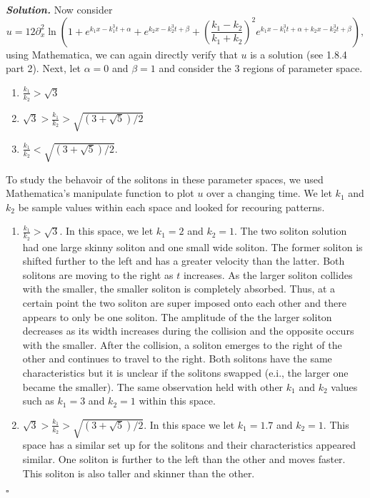 \documentclass[12pt]{report}
\newenvironment{solution}[1][\it{Solution}]{\textbf{#1. } }{$\square$}
\begin{document}
\begin{solution}
    \noindent
    Now consider
    $$u = 12 \partial_x^2\ln\left(1 + e^{k_1 x - k_1^3t + \alpha} + e^{k_2 x - k_2^3t + \beta} + \left(\frac{k_1-k_2}{k_1 + k_2}\right)^2e^{k_1x - k_1^3t + \alpha + k_2x - k_2^3t+ \beta}\right),$$
    using Mathematica, we can again directly verify that $u$ is a solution (see 1.8.4 part 2).
    Next, let $\alpha = 0$ and $\beta = 1$ and consider the 3 regions of parameter space. 
    \begin{enumerate}
        \item $\frac{k_1}{k_2} > \sqrt{3}$
        \item $\sqrt{3} > \frac{k_1}{k_2} > \sqrt{(3 + \sqrt{5})/2}$
        \item $\frac{k_1}{k_2} < \sqrt{(3 + \sqrt{5})/2}$.
    \end{enumerate}
    To study the behavoir of the solitons in these parameter spaces, we used Mathematica's manipulate function to plot $u$ over a changing time. 
    We let $k_1$ and $k_2$ be sample values within each space and looked for recouring patterns.
    \begin{enumerate}
        \item $\frac{k_1}{k_2} > \sqrt{3}$. In this space, we let $k_1 = 2$ and $k_2 = 1$.
        The two soliton solution had one large skinny soliton and one small wide soliton. The former soliton is shifted further to the left and has a greater velocity than the latter. Both solitons are moving to the right as $t$ increases.
        As the larger soliton collides with the smaller, the smaller soliton is completely absorbed. Thus, at a certain point the two soliton are super imposed onto each other and there appears to only be one soliton.
        The amplitude of the the larger soliton decreases as its width increases during the collision and the opposite occurs with the smaller.
        After the collision, a soliton emerges to the right of the other and continues to travel to the right. Both solitons have the same characteristics but it is unclear if the solitons swapped (e.i., the larger one became the smaller).
        The same observation held with other $k_1$ and $k_2$ values such as $k_1 = 3$ and $k_2=1$ within this space.
        \item $\sqrt{3} > \frac{k_1}{k_2} > \sqrt{(3 + \sqrt{5})/2}$. In this space we let $k_1 = 1.7$ and $k_2 = 1$. This space has a similar set up for the solitons and their characteristics appeared similar. 
        One soliton is further to the left than the other and moves faster. This soliton is also taller and skinner than the other. 

\end{enumerate}
\end{solution}
\end{document}
